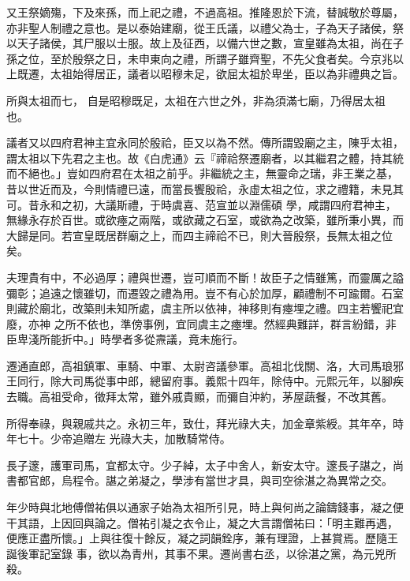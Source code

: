 \begin{pinyinscope}
 又王祭嫡殤，下及來孫，而上祀之禮，不過高祖。推隆恩於下流，替誠敬於尊屬，亦非聖人制禮之意也。是以泰始建廟，從王氏議，以禮父為士，子為天子諸侯，祭以天子諸侯，其尸服以士服。故上及征西，以備六世之數，宣皇雖為太祖，尚在子孫之位，至於殷祭之日，未申東向之禮，所謂子雖齊聖，不先父食者矣。今京兆以上既遷，太祖始得居正，議者以昭穆未足，欲屈太祖於卑坐，臣以為非禮典之旨。



 所與太祖而七，
 自是昭穆既足，太祖在六世之外，非為須滿七廟，乃得居太祖也。



 議者又以四府君神主宜永同於殷祫，臣又以為不然。傳所謂毀廟之主，陳乎太祖，謂太祖以下先君之主也。故《白虎通》云『禘祫祭遷廟者，以其繼君之體，持其統而不絕也。」豈如四府君在太祖之前乎。非繼統之主，無靈命之瑞，非王業之基，昔以世近而及，今則情禮已遠，而當長饗殷祫，永虛太祖之位，求之禮籍，未見其可。昔永和之初，大議斯禮，于時虞喜、范宣並以淵儒碩
 學，咸謂四府君神主，無緣永存於百世。或欲瘞之兩階，或欲藏之石室，或欲為之改築，雖所秉小異，而大歸是同。若宣皇既居群廟之上，而四主禘祫不已，則大晉殷祭，長無太祖之位矣。



 夫理貴有中，不必過厚；禮與世遷，豈可順而不斷！故臣子之情雖篤，而靈厲之謚彌彰；追遠之懷雖切，而遷毀之禮為用。豈不有心於加厚，顧禮制不可踰爾。石室則藏於廟北，改築則未知所處，虞主所以依神，神移則有瘞埋之禮。四主若饗祀宜廢，亦神
 之所不依也，準傍事例，宜同虞主之瘞埋。然經典難詳，群言紛錯，非臣卑淺所能折中。」時學者多從燾議，竟未施行。



 遷通直郎，高祖鎮軍、車騎、中軍、太尉咨議參軍。高祖北伐關、洛，大司馬琅邪王同行，除大司馬從事中郎，總留府事。義熙十四年，除侍中。元熙元年，以腳疾去職。高祖受命，徵拜太常，雖外戚貴顯，而彌自沖約，茅屋蔬餐，不改其舊。



 所得奉祿，與親戚共之。永初三年，致仕，拜光祿大夫，加金章紫綬。其年卒，時年七十。少帝追贈左
 光祿大夫，加散騎常侍。



 長子邃，護軍司馬，宜都太守。少子綽，太子中舍人，新安太守。邃長子諶之，尚書都官郎，烏程令。諶之弟凝之，學涉有當世才具，與司空徐湛之為異常之交。



 年少時與北地傅僧祐俱以通家子始為太祖所引見，時上與何尚之論鑄錢事，凝之便干其語，上因回與論之。僧祐引凝之衣令止，凝之大言謂僧祐曰：「明主難再遇，便應正盡所懷。」上與往復十餘反，凝之詞韻銓序，兼有理證，上甚賞焉。歷隨王誕後軍記室錄
 事，欲以為青州，其事不果。遷尚書右丞，以徐湛之黨，為元兇所殺。




\end{pinyinscope}
